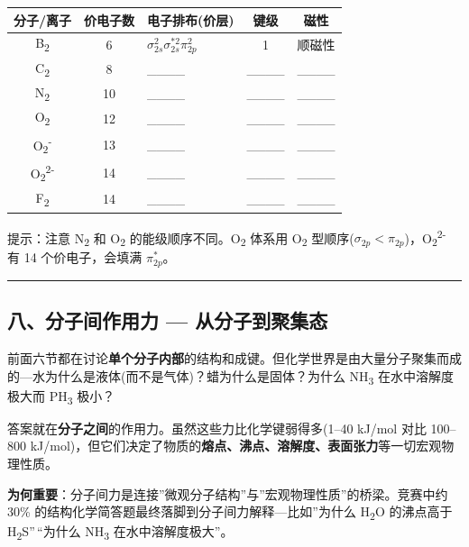 \documentclass[a4paper,11pt]{ctexart}
\newcounter{none}
\newcommand{\箭}{\ensuremath{\rightarrow}}
\newcommand{\左箭}{\ensuremath{\leftarrow}}
\newcommand{\上箭}{\ensuremath{\uparrow}}
\newcommand{\下箭}{\ensuremath{\downarrow}}
\newcommand{\衡}{\ensuremath{\rightleftharpoons}}
\newcommand{\双箭}{\ensuremath{\leftrightarrow}}
\newcommand{\约等于}{\ensuremath{\approx}}
\newcommand{\小于等于}{\ensuremath{\leq}}
\newcommand{\大于等于}{\ensuremath{\geq}}
\newcommand{\不等于}{\ensuremath{\neq}}
\newcommand{\西格马}{\ensuremath{\sigma}}
\newcommand{\派}{\ensuremath{\pi}}
\begin{document}
{\def\LTcaptype{none} %
\begin{longtable}[]{@{}cclcc@{}}
\toprule\noalign{}
分子/离子 & 价电子数 & 电子排布(价层) & 键级 & 磁性 \\
\midrule\noalign{}
\endhead
\bottomrule\noalign{}
\endlastfoot
B\textsubscript{2} & 6 & \(\sigma_{2s}^2 \sigma_{2s}^{*2} \pi_{2p}^2\) & 1 & 顺磁性 \\
C\textsubscript{2} & 8 & \_\_\_\_ & \_\_\_\_ & \_\_\_\_ \\
N\textsubscript{2} & 10 & \_\_\_\_ & \_\_\_\_ & \_\_\_\_ \\
O\textsubscript{2} & 12 & \_\_\_\_ & \_\_\_\_ & \_\_\_\_ \\
O\textsubscript{2}\textsuperscript{-} & 13 & \_\_\_\_ & \_\_\_\_ & \_\_\_\_ \\
O\textsubscript{2}\textsuperscript{2-} & 14 & \_\_\_\_ & \_\_\_\_ & \_\_\_\_ \\
F\textsubscript{2} & 14 & \_\_\_\_ & \_\_\_\_ & \_\_\_\_ \\
\end{longtable}
}

提示：注意 N\textsubscript{2} 和 O\textsubscript{2} 的能级顺序不同。O\textsubscript{2} 体系用 O\textsubscript{2} 型顺序(\(\sigma_{2p}<\pi_{2p}\))，O\textsubscript{2}\textsuperscript{2-} 有 14 个价电子，会填满 \(\pi_{2p}^*\)。

\begin{center}\rule{0.5\linewidth}{0.5pt}\end{center}

\subsection{八、分子间作用力 --- 从分子到聚集态}\label{ux516bux5206ux5b50ux95f4ux4f5cux7528ux529b-ux4eceux5206ux5b50ux5230ux805aux96c6ux6001}

前面六节都在讨论\textbf{单个分子内部}的结构和成键。但化学世界是由大量分子聚集而成的---水为什么是液体(而不是气体)？蜡为什么是固体？为什么 NH\textsubscript{3} 在水中溶解度极大而 PH\textsubscript{3} 极小？

答案就在\textbf{分子之间}的作用力。虽然这些力比化学键弱得多(1--40 kJ/mol 对比 100--800 kJ/mol)，但它们决定了物质的\textbf{熔点、沸点、溶解度、表面张力}等一切宏观物理性质。

\textbf{为何重要}：分子间力是连接''微观分子结构''与''宏观物理性质''的桥梁。竞赛中约 30\% 的结构化学简答题最终落脚到分子间力解释---比如''为什么 H\textsubscript{2}O 的沸点高于 H\textsubscript{2}S''\,``为什么 NH\textsubscript{3} 在水中溶解度极大''。
\end{document}
